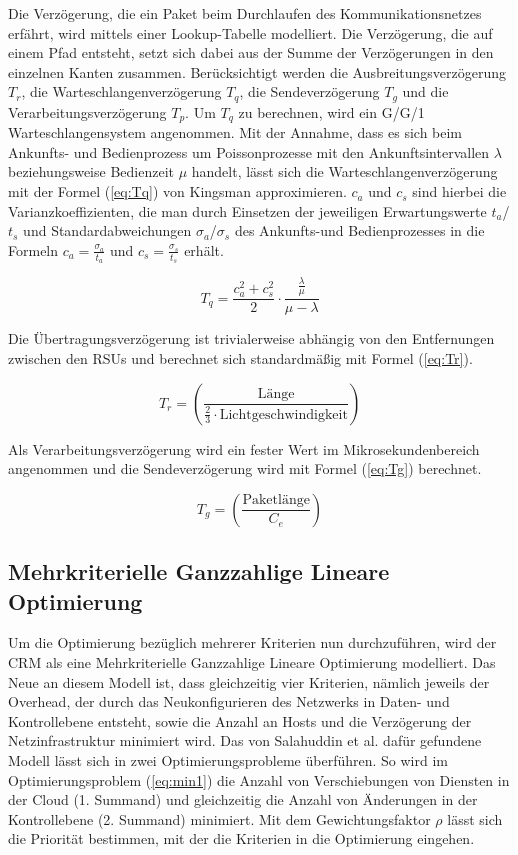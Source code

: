 \documentclass[conference]{IEEEtran}
\begin{document}
Die Verzögerung, die ein Paket beim Durchlaufen des Kommunikationsnetzes erfährt, wird mittels einer Lookup-Tabelle modelliert. Die Verzögerung, die auf einem Pfad entsteht, setzt sich dabei aus der Summe der Verzögerungen in den einzelnen Kanten zusammen. Berücksichtigt werden die Ausbreitungsverzögerung \(T_r\), die Warteschlangenverzögerung \(T_q\), die Sendeverzögerung \(T_g\) und die Verarbeitungsverzögerung \(T_p\). Um \(T_q\) zu berechnen, wird ein G/G/1 Warteschlangensystem angenommen. Mit der Annahme, dass es sich beim Ankunfts- und Bedienprozess um Poissonprozesse mit den Ankunftsintervallen \(\lambda\) beziehungsweise Bedienzeit \(\mu\) handelt, lässt sich die Warteschlangenverzögerung mit der Formel (\ref{eq:Tq}) von Kingsman \cite{IEEEhowto:king} approximieren. \(c_a\) und \(c_s\) sind hierbei die Varianzkoeffizienten, die man durch Einsetzen der jeweiligen Erwartungswerte \(t_a\)/\(t_s\) und Standardabweichungen \(\sigma_a\)/\(\sigma_s\) des Ankunfts-und Bedienprozesses in die Formeln \(c_a=\frac{\sigma_a}{t_a}\) und \(c_s=\frac{\sigma_s}{t_s}\) erhält.

\begin{equation}
T_q=\frac{c_a^2+c_s^2}{2}\cdot \frac{\frac{\lambda}{\mu}}{\mu-\lambda}
\label{eq:Tq}
\end{equation}

Die Übertragungsverzögerung ist trivialerweise abhängig von den Entfernungen zwischen den RSUs und berechnet sich standardmäßig mit Formel (\ref{eq:Tr}).

\begin{equation}
T_r=\left(\frac{\text{L\"ange}}{\frac{2}{3}\cdot \text{Lichtgeschwindigkeit}}\right)
\label{eq:Tr}
\end{equation}

Als Verarbeitungsverzögerung wird ein fester Wert im Mikrosekundenbereich angenommen und die Sendeverzögerung wird mit Formel (\ref{eq:Tg}) berechnet.

\begin{equation}
T_g=\left(\frac{\text{Paketl\"ange}}{C_e}\right)
\label{eq:Tg}
\end{equation}


\subsection{Mehrkriterielle Ganzzahlige Lineare Optimierung}

Um die Optimierung bezüglich mehrerer Kriterien nun durchzuführen, wird der CRM als eine Mehrkriterielle Ganzzahlige Lineare Optimierung modelliert. Das Neue an diesem Modell ist, dass gleichzeitig vier Kriterien, nämlich jeweils der Overhead, der durch das Neukonfigurieren des Netzwerks in Daten- und Kontrollebene entsteht, sowie die Anzahl an Hosts und die Verzögerung der Netzinfrastruktur minimiert wird. Das von Salahuddin et al. dafür gefundene Modell lässt sich in zwei Optimierungsprobleme überführen.
So wird im Optimierungsproblem (\ref{eq:min1}) die Anzahl von Verschiebungen von Diensten in der Cloud (1. Summand) und gleichzeitig die Anzahl von Änderungen in der Kontrollebene (2. Summand) minimiert. Mit dem Gewichtungsfaktor \(\rho\) lässt sich die Priorität bestimmen, mit der die Kriterien in die Optimierung eingehen. 
\end{document}
